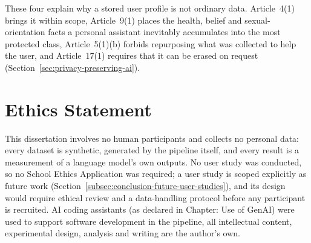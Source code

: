 These four explain why a stored user profile is not ordinary data. Article~4(1) brings it within scope, Article~9(1) places the health, belief and sexual-orientation facts a personal assistant inevitably accumulates into the most protected class, Article~5(1)(b) forbids repurposing what was collected to help the user, and Article~17(1) requires that it can be erased on request (Section~\ref{sec:privacy-preserving-ai}).

\section*{Ethics Statement}
\label{chap:ethics-statement}

This dissertation involves no human participants and collects no personal data: every dataset is synthetic, generated by the pipeline itself, and every result is a measurement of a language model's own outputs. No user study was conducted, so no School Ethics Application was required; a user study is scoped explicitly as future work (Section~\ref{subsec:conclusion-future-user-studies}), and its design would require ethical review and a data-handling protocol before any participant is recruited. AI coding assistants (as declared in Chapter: Use of GenAI) were used to support software development in the pipeline, all intellectual content, experimental design, analysis and writing are the author's own.
